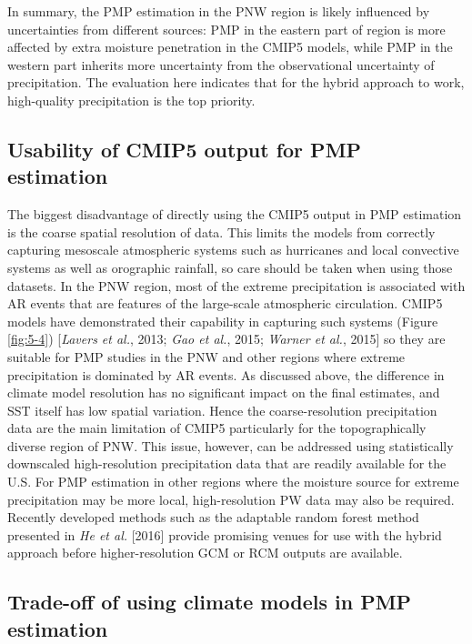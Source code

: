 In summary, the PMP estimation in the PNW region is likely influenced by uncertainties from different sources: PMP in the eastern part of region is more affected by extra moisture penetration in the CMIP5 models, while PMP in the western part inherits more uncertainty from the observational uncertainty of precipitation. The evaluation here indicates that for the hybrid approach to work, high-quality precipitation is the top priority.

\subsection{Usability of CMIP5 output for PMP estimation}

The biggest disadvantage of directly using the CMIP5 output in PMP estimation is the coarse spatial resolution of data. This limits the models from correctly capturing mesoscale atmospheric systems such as hurricanes and local convective systems as well as orographic rainfall, so care should be taken when using those datasets. In the PNW region, most of the extreme precipitation is associated with AR events that are features of the large-scale atmospheric circulation. CMIP5 models have demonstrated their capability in capturing such systems (Figure \ref{fig:5-4}) [\textit{Lavers et al.}, 2013; \textit{Gao et al.}, 2015; \textit{Warner et al.}, 2015] so they are suitable for PMP studies in the PNW and other regions where extreme precipitation is dominated by AR events. As discussed above, the difference in climate model resolution has no significant impact on the final estimates, and SST itself has low spatial variation. Hence the coarse-resolution precipitation data are the main limitation of CMIP5 particularly for the topographically diverse region of PNW. This issue, however, can be addressed using statistically downscaled high-resolution precipitation data that are readily available for the U.S. For PMP estimation in other regions where the moisture source for extreme precipitation may be more local, high-resolution PW data may also be required. Recently developed methods such as the adaptable random forest method presented in \textit{He et al.} [2016] provide promising venues for use with the hybrid approach before higher-resolution GCM or RCM outputs are available.

\subsection{Trade-off of using climate models in PMP estimation}

